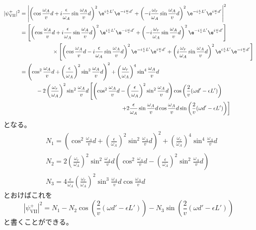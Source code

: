 \begin{align}
|\psi_\mathrm{VII}^+|^2&=\Biggl| \left(\cos \frac{\omega_A}{v}d +i\frac{\epsilon}{\omega_A} \sin \frac{\omega_A}{v}d\right)^2\e^{i\frac{\epsilon}{v}L'}\e^{-i\frac{\omega}{v}d'} +\left(-i \frac{\omega_r}{\omega_A} \sin \frac{\omega_A}{v}d\right)^2\e^{-i\frac{\epsilon}{v}L'}\e^{i\frac{\omega}{v}d'} \Biggr|^2 \notag \\
&=\left[\left(\cos \frac{\omega_A}{v}d +i\frac{\epsilon}{\omega_A} \sin \frac{\omega_A}{v}d\right)^2\e^{i\frac{\epsilon}{v}L'}\e^{-i\frac{\omega}{v}d'} +\left(-i \frac{\omega_r}{\omega_A} \sin \frac{\omega_A}{v}d\right)^2\e^{-i\frac{\epsilon}{v}L'}\e^{i\frac{\omega}{v}d'}\right] \notag\\
&\hspace{2cm} \times \left[\left(\cos \frac{\omega_A}{v}d -i\frac{\epsilon}{\omega_A} \sin \frac{\omega_A}{v}d\right)^2\e^{-i\frac{\epsilon}{v}L'}\e^{i\frac{\omega}{v}d'} +\left(i \frac{\omega_r}{\omega_A} \sin \frac{\omega_A}{v}d\right)^2\e^{i\frac{\epsilon}{v}L'}\e^{-i\frac{\omega}{v}d'}\right] \notag \\
&=\left(\cos^2 \frac{\omega_A}{v}d +\left(\frac{\epsilon}{\omega_A}\right)^2 \sin^2 \frac{\omega_A}{v}d\right)^2+\left(\frac{\omega_r}{\omega_A}\right)^4 \sin^4 \frac{\omega_A}{v}d \notag \\
&\hspace{1cm}  -2\left(\frac{\omega_r}{\omega_A}\right)^2\sin^2\frac{\omega_A}{v}d \left[\left(\cos^2 \frac{\omega_A}{v}d -\left(\frac{\epsilon}{\omega_A}\right)^2 \sin^2 \frac{\omega_A}{v}d\right) \cos \left(\frac{2}{v}(\omega d'-\epsilon L')\right) \right. \notag \\
&\hspace{6.3cm} \left.+2 \frac{\epsilon}{\omega_A} \sin \frac{\omega_A}{v}d \cos \frac{\omega_A}{v}d \sin \left(\frac{2}{v}(\omega d'-\epsilon L')\right)\right]
\end{align}
となる。
\begin{align}
&N_1 = \left(\cos^2 \frac{\omega_A}{v}d +\left(\frac{\epsilon}{\omega_A}\right)^2 \sin^2 \frac{\omega_A}{v}d\right)^2+\left(\frac{\omega_r}{\omega_A}\right)^4 \sin^4 \frac{\omega_A}{v}d \\
&N_2 = 2\left(\frac{\omega_r}{\omega_A}\right)^2\sin^2\frac{\omega_A}{v}d \left(\cos^2 \frac{\omega_A}{v}d -\left(\frac{\epsilon}{\omega_A}\right)^2 \sin^2 \frac{\omega_A}{v}d\right) \\
&N_3 = 4\frac{\epsilon}{\omega_A} \left(\frac{\omega_r}{\omega_A}\right)^2\sin^3\frac{\omega_A}{v}d \cos \frac{\omega_A}{v}d
\end{align}
とおけばこれを
\begin{equation}
|\psi_\mathrm{VII}^+|^2 =N_1 -N_2 \cos \left(\frac{2}{v}(\omega d'-\epsilon L')\right)-N_3 \sin  \left(\frac{2}{v}(\omega d'-\epsilon L')\right) \label{Resonance_interference2}
\end{equation}
と書くことができる。

